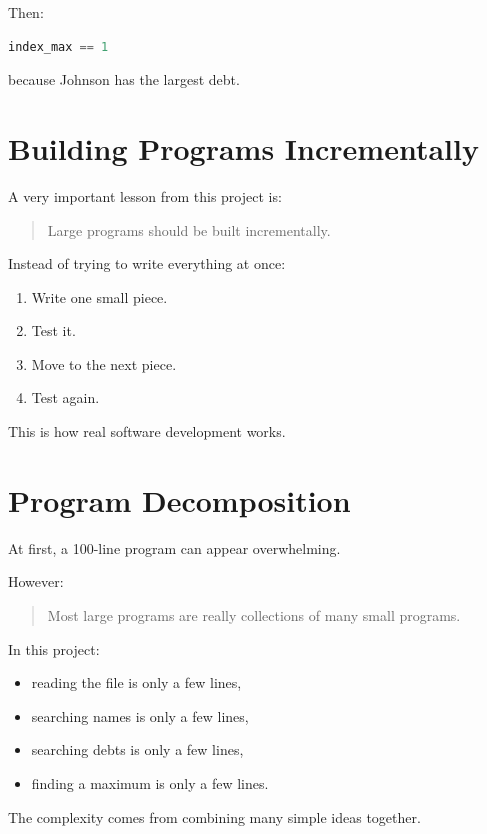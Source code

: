 \documentclass[11pt]{article}
\begin{document}
Then:

\begin{lstlisting}[language=Python]
index_max == 1
\end{lstlisting}

because Johnson has the largest debt.

\section{Building Programs Incrementally}

A very important lesson from this project is:

\begin{quote}
Large programs should be built incrementally.
\end{quote}

Instead of trying to write everything at once:

\begin{enumerate}
    \item Write one small piece.
    \item Test it.
    \item Move to the next piece.
    \item Test again.
\end{enumerate}

This is how real software development works.

\section{Program Decomposition}

At first, a 100-line program can appear overwhelming.

However:

\begin{quote}
Most large programs are really collections of many small programs.
\end{quote}

In this project:

\begin{itemize}
    \item reading the file is only a few lines,
    \item searching names is only a few lines,
    \item searching debts is only a few lines,
    \item finding a maximum is only a few lines.
\end{itemize}

The complexity comes from combining many simple ideas together.
\end{document}
